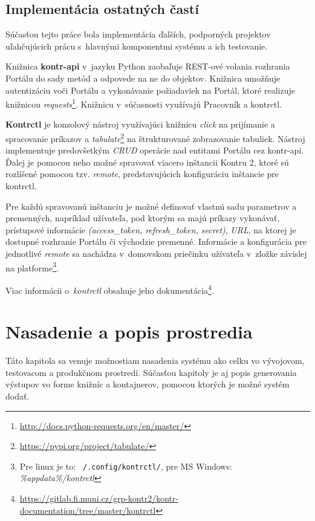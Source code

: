 \documentclass[
  digital, %
  oneside, %
  table,   %
  lof,     %
  lot,   %
]{fithesis3}
\newcommand*{\footurl}[1]{\footnote{\url{#1}}}
\begin{document}
\section{Implementácia ostatných častí}

\label{impl-other-parts}
Súčasťou tejto práce bola implementácia ďalších, podporných projektov uľahčujúcich prácu s~hlavnými komponentmi systému a ich testovanie.

Knižnica \textbf{kontr-api} v~jazyku Python zaobaľuje REST-ové volania rozhrania Portálu do sady metód a odpovede na ne do objektov. Knižnica umožňuje autentizáciu voči Portálu a vykonávanie požiadaviek na Portál, ktoré realizuje knižnicou \emph{requests}\footurl{http://docs.python-requests.org/en/master/}. Knižnicu v~súčasnosti využívajú Pracovník a kontrctl. 

\textbf{Kontrctl} je konzolový nástroj využívajúci knižnicu \emph{click} na prijímanie a spracovanie príkazov a \emph{tabulate}\footurl{https://pypi.org/project/tabulate/} na štrukturované zobrazovanie tabuliek. Nástroj implementuje predovšetkým \emph{CRUD} operácie nad entitami Portálu cez kontr-api. Ďalej je pomocou neho možné spravovať viacero inštancii Kontru 2, ktoré sú rozlíšené pomocou tzv. \emph{remote}, predstavujúcich konfiguráciu inštancie pre kontrctl.

Pre každú spravovanú inštanciu je možné definovať vlastnú sadu parametrov a premenných, napríklad užívateľa, pod ktorým sa majú príkazy vykonávať, prístupové informácie \emph{(access\_token, refresh\_token, secret)}, \emph{URL}, na ktorej je dostupné rozhranie Portálu či východzie premenné. Informácie a konfigurácia pre jednotlivé \emph{remote} sa nachádza v~domovskom priečinku užívateľa v~zložke závislej na platforme\footnote{Pre linux je to: \texttt{~/.config/kontrctl/}, pre MS Windows: \emph{\%appdata\%/kontrctl}}.

Viac informácii o~\emph{kontrctl} obsahuje jeho dokumentácia\footnote{\url{https://gitlab.fi.muni.cz/grp-kontr2/kontr-documentation/tree/master/kontrctl}}.

\chapter{Nasadenie a popis prostredia}

Táto kapitola sa venuje možnostiam nasadenia systému ako celku vo vývojovom, testovacom a produkčnom prostredí. Súčasťou kapitoly je aj popis generovania výstupov vo forme knižníc a kontajnerov, pomocou ktorých je možné systém dodať.
\end{document}
